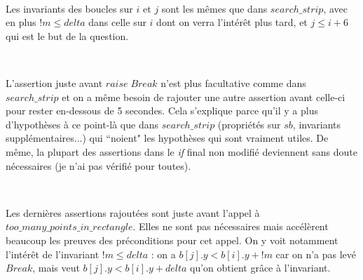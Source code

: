 \documentclass[11pt, openany, titlepage]{article}
\begin{document}
\

Les invariants des boucles sur $i$ et $j$ sont les mêmes que dans $search\_strip$, avec en plus $!m\leq delta$ dans celle sur $i$ dont on verra l'intérêt plus tard, et $j\leq i+6$ qui est le but de la question.

\

L'assertion juste avant $raise\;Break$ n'est plus facultative comme dans $search\_strip$ et on a même besoin de rajouter une autre assertion avant celle-ci pour rester en-dessous de 5 secondes. Cela s'explique parce qu'il y a plus d'hypothèses à ce point-là que dans $search\_strip$ (propriétés sur $sb$, invariants supplémentaires...) qui ``noient" les hypothèses qui sont vraiment utiles. De même, la plupart des assertions dans le \emph{if} final non modifié deviennent sans doute nécessaires (je n'ai pas vérifié pour toutes).

\

Les dernières assertions rajoutées sont juste avant l'appel à $too\_many\_points\_in\_rectangle$. Elles ne sont pas nécessaires mais accélèrent beaucoup les preuves des préconditions pour cet appel. On y voit notamment l'intérêt de l'invariant $!m\leq delta$ : on a $b[j].y < b[i].y+!m$ car on n'a pas levé $Break$, mais veut $b[j].y < b[i].y+delta$ qu'on obtient grâce à l'invariant.

\end{document}
